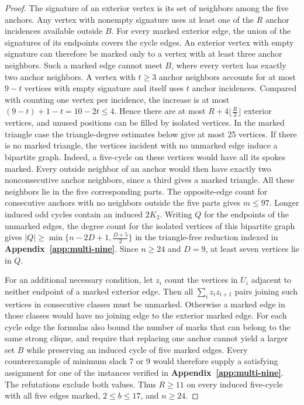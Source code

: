 \begin{proof}
The signature of an exterior vertex is its set of
neighbors among the five anchors. Any vertex with
nonempty signature uses at least one of the $R$ anchor
incidences available outside $B$. For every marked
exterior edge, the union of the signatures of its
endpoints covers the cycle edges. An exterior vertex
with empty signature can therefore be marked only to
a vertex with at least three anchor neighbors. Such a
marked edge cannot meet $B$, where every vertex has
exactly two anchor neighbors. A vertex with $t\ge3$
anchor neighbors accounts for at most $9-t$ vertices with
empty signature and itself uses $t$ anchor incidences.
Compared with counting one vertex per incidence, the
increase is at most $(9-t)+1-t=10-2t\le4$. Hence there
are at most $R+4\lfloor\frac{R}{3}\rfloor$ exterior
vertices, and unused positions can be filled by isolated
vertices. In the marked triangle case the triangle-degree estimates below give
at most 25 vertices. If there is no marked triangle, the vertices
incident with no unmarked edge induce a bipartite graph. Indeed, a
five-cycle on these vertices would have all its spokes marked. Every
outside neighbor of an anchor would then have exactly two
nonconsecutive anchor neighbors, since a third gives a marked
triangle. All these neighbors lie in the five corresponding parts.
The opposite-edge count for consecutive anchors with no neighbors
outside the five parts gives $m\leq97$. Longer induced odd cycles
contain an induced $2K_2$. Writing $Q$ for the endpoints of the
unmarked edges, the degree count for the isolated vertices of this
bipartite graph gives
$|Q|\geq\min\{n-2D+1,\frac{D+5}{2}\}$ in the triangle-free
reduction indexed in \textbf{Appendix~\ref{app:multi-nine}}.
Since $n\geq24$ and $D=9$, at least seven vertices lie in $Q$.

For an additional necessary condition, let $z_i$ count the
vertices in $U_i$ adjacent to neither endpoint of a
marked exterior edge. Then all $\sum_i z_i z_{i+1}$
pairs joining such vertices in consecutive classes must
be unmarked. Otherwise a marked edge in those classes would have no joining
edge to the exterior marked edge. For each cycle edge the formulas
also bound the number of marks that can belong to the same strong clique,
and require that replacing one anchor cannot yield a
larger set $B$ while preserving an induced cycle of
five marked edges.
Every counterexample of minimum slack 7 or 9 would therefore
supply a satisfying assignment for one of the instances verified
in \textbf{Appendix~\ref{app:multi-nine}}. The refutations exclude both
values. Thus $R\geq11$ on every induced five-cycle with all five
edges marked, $2\leq b\leq17$, and $n\geq24$.

\end{proof}

